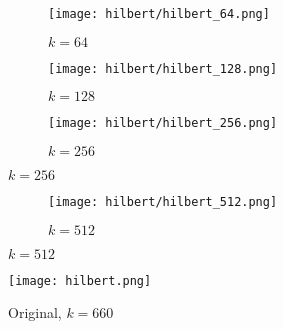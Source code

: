 \documentclass{article}
\begin{document}
\begin{figure}[H]
  \begin{subfigure}{.32\textwidth}
    \centering
    \texttt{[image: hilbert/hilbert\_64.png]}
    \caption{$k=64$}
  \end{subfigure}
  \begin{subfigure}{.32\textwidth}
    \centering
    \texttt{[image: hilbert/hilbert\_128.png]}
    \caption{$k=128$}
  \end{subfigure}
  \begin{subfigure}{.32\textwidth}
    \centering
    \texttt{[image: hilbert/hilbert\_256.png]}
    \caption{$k=256$}
  \end{subfigure}
\end{figure}
\begin{figure}[H]
  \begin{subfigure}{.32\textwidth}
    \centering
    \texttt{[image: hilbert/hilbert\_512.png]}
    \caption{$k=512$}
  \end{subfigure}
\end{figure}
\begin{figure}[H]
  \centering
  \texttt{[image: hilbert.png]}
  \caption{Original, $k=660$}
\end{figure}
\end{document}
